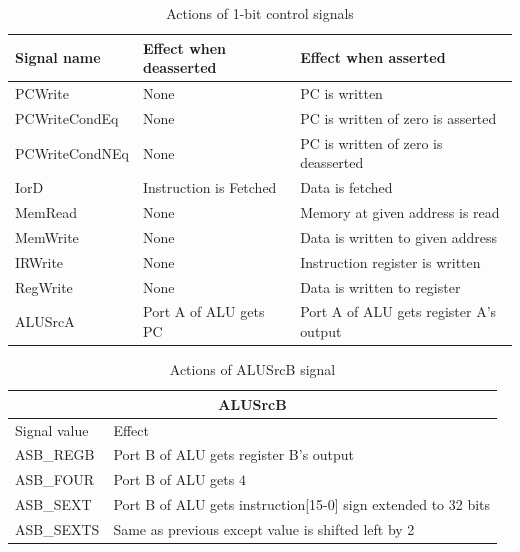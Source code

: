 \documentclass[12pt, a4paper]{article}
\begin{document}
\begin{table}[h]
  \centering
  \begin{tabular}{l | l | l}
    \hline
    Signal name    & Effect when deasserted & Effect when asserted \\ \hline
    PCWrite        & None                   & PC is written \\
    PCWriteCondEq  & None                   & PC is written of zero is asserted \\
    PCWriteCondNEq & None                   & PC is written of zero is deasserted \\
    IorD           & Instruction is Fetched & Data is fetched \\
    MemRead        & None                   & Memory at given address is read \\
    MemWrite       & None                   & Data is written to given address \\
    IRWrite        & None                   & Instruction register is written \\
    RegWrite       & None                   & Data is written to register \\
    ALUSrcA        & Port A of ALU gets PC  & Port A of ALU gets register A's output \\
    \hline
  \end{tabular}
  \caption{Actions of 1-bit control signals}
  \label{tbl:1bit}
\end{table}

\begin{table}[h]
  \centering
  \begin{tabular}{l | l} \hline
    \multicolumn{2}{c}{ALUSrcB} \\ \hline
    Signal value & Effect \\ \hline
    ASB\_REGB & Port B of ALU gets register B's output \\
    ASB\_FOUR & Port B of ALU gets $4$ \\
    ASB\_SEXT & Port B of ALU gets instruction[15-0] sign extended to 32 bits \\
    ASB\_SEXTS & Same as previous except value is shifted left by 2 \\
    \hline
  \end{tabular}
  \caption{Actions of ALUSrcB signal}
  \label{tbl:alusrcb}
\end{table}
\end{document}
